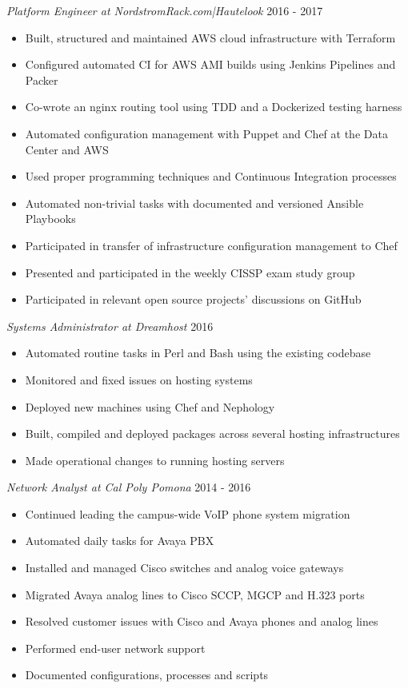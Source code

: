 \documentclass[line]{tex/res}
\begin{document}
\begin{resume}
    {\sl Platform Engineer at NordstromRack.com|Hautelook} \hfill 2016 - 2017
    \begin{itemize} \itemsep -2pt %
        \item Built, structured and maintained AWS cloud infrastructure with Terraform
        \item Configured automated CI for AWS AMI builds using Jenkins Pipelines and Packer
        \item Co-wrote an nginx routing tool using TDD and a Dockerized testing harness
        \item Automated configuration management with Puppet and Chef at the Data Center and AWS
        \item Used proper programming techniques and Continuous Integration processes
        \item Automated non-trivial tasks with documented and versioned Ansible Playbooks
        \item Participated in transfer of infrastructure configuration management to Chef
        \item Presented and participated in the weekly CISSP exam study group
        \item Participated in relevant open source projects' discussions on GitHub
    \end{itemize}

	{\sl Systems Administrator at Dreamhost} \hfill 2016
	\begin{itemize} \itemsep -2pt
		\item Automated routine tasks in Perl and Bash using the existing codebase
		\item Monitored and fixed issues on hosting systems
		\item Deployed new machines using Chef and Nephology
		\item Built, compiled and deployed packages across several hosting infrastructures
		\item Made operational changes to running hosting servers
	\end{itemize}

	{\sl Network Analyst at Cal Poly Pomona} \hfill 2014 - 2016
	\begin{itemize} \itemsep -2pt
		\item Continued leading the campus-wide VoIP phone system migration
		\item Automated daily tasks for Avaya PBX
		\item Installed and managed Cisco switches and analog voice gateways
		\item Migrated Avaya analog lines to Cisco SCCP, MGCP and H.323 ports
		\item Resolved customer issues with Cisco and Avaya phones and analog lines
		\item Performed end-user network support
		\item Documented configurations, processes and scripts
	\end{itemize}


\end{resume}
\end{document}
